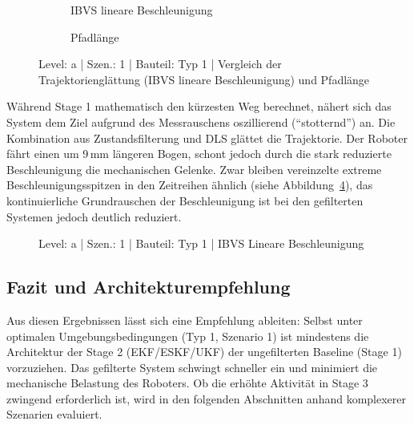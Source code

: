 \begin{figure}[htbp]
    \centering
    \begin{subfigure}[b]{0.49\textwidth}
        \caption{IBVS lineare Beschleunigung}
        \label{fig:a_1_Typ1_mean_ibvs_lin_acc}
    \end{subfigure}
    \hfill
    \begin{subfigure}[b]{0.49\textwidth}
        \caption{Pfadlänge}
        \label{fig:a_1_Typ1_path_length}
    \end{subfigure}
    \caption{Level: a | Szen.: 1 | Bauteil: Typ 1 | Vergleich der Trajektorienglättung (IBVS lineare Beschleunigung) und Pfadlänge}
    \label{fig:a_1_Typ1_timeseries_median_ibvs_lin_acc_l2_path_length}
\end{figure}

Während Stage 1 mathematisch den kürzesten Weg berechnet, nähert sich das System dem Ziel aufgrund des Messrauschens oszillierend (\enquote{stotternd}) an. Die Kombination aus Zustandsfilterung und \ac{DLS} glättet die Trajektorie. Der Roboter fährt einen um 9\,mm längeren Bogen, schont jedoch durch die stark reduzierte Beschleunigung die mechanischen Gelenke. Zwar bleiben vereinzelte extreme Beschleunigungsspitzen in den Zeitreihen ähnlich (siehe Abbildung~\ref{fig:a_1_Typ1_timeseries_median_ibvs_lin_acc_l2}), das kontinuierliche Grundrauschen der Beschleunigung ist bei den gefilterten Systemen jedoch deutlich reduziert.

\begin{figure}[H]
    \centering
    \caption{Level: a | Szen.: 1 | Bauteil: Typ 1 | IBVS Lineare Beschleunigung}
    \label{fig:a_1_Typ1_timeseries_median_ibvs_lin_acc_l2}
\end{figure}

\subsection{Fazit und Architekturempfehlung}
Aus diesen Ergebnissen lässt sich eine Empfehlung ableiten: Selbst unter optimalen Umgebungsbedingungen (Typ 1, Szenario 1) ist mindestens die Architektur der Stage 2 (\ac{EKF}/\ac{ESKF}/\ac{UKF}) der ungefilterten Baseline (Stage 1) vorzuziehen. Das gefilterte System schwingt schneller ein und minimiert die mechanische Belastung des Roboters. Ob die erhöhte Aktivität in Stage 3 zwingend erforderlich ist, wird in den folgenden Abschnitten anhand komplexerer Szenarien evaluiert.

